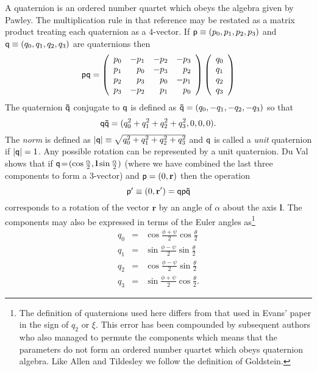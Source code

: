 \documentclass[a4paper,twoside]{report}
\providecommand{\bm}[1]{\mathbf{#1}}
\begin{document}
A quaternion  is an ordered number  quartet  which obeys  the  algebra
given  by   Pawley\cite{pawley:81}.  The multiplication   rule in that
reference may be restated as a matrix product treating each quaternion
as a  4-vector.  If  $\Quat{p} \equiv (p_0,p_1,p_2,p_3)$ and  $\Quat{q}
\equiv  (q_0,q_1,q_2,q_3)$  are quaternions then
\begin{equation}
\Quat{pq} = 
\left(
\begin{array}{rrrr}
p_0 & -p_1 & -p_2 & -p_3 \\
p_1 &  p_0 & -p_3 &  p_2 \\
p_2 &  p_3 &  p_0 & -p_1 \\
p_3 & -p_2 &  p_1 &  p_0 
\end{array}
\right) \left(
\begin{array}{r}
q_0 \\ q_1 \\ q_2 \\ q_3
\end{array}
\right)
\end{equation}
The quaternion $ \Quat{\tilde{q}} $ conjugate to $\Quat{q}$ is defined
as $\Quat{\tilde{q}} = (q_0,-q_1,-q_2,-q_3)$ so that
\begin{equation}
\Quat{q\tilde{q}} = (q_0^2+q_1^2+q_2^2+q_3^2,0,0,0).
\label{eqn:qnorm}
\end{equation}
The \emph{norm} is defined as $ |\Quat{q}| \equiv
\sqrt{q_0^2+q_1^2+q_2^2+q_3^2} $ and $\Quat{q}$ is called a
\emph{unit} quaternion if $ |\Quat{q}| = 1 $.  Any possible rotation
can be represented by a unit quaternion. Du Val shows\cite{duval:64}
that if $ \Quat{q} \! = \! (\cos \frac{\alpha}{2}, \bm{l} \sin
\frac{\alpha}{2}) $ (where we have combined the last three components
to form a 3-vector) and $\Quat{p} = (0,\bm{r})$ then the operation
\begin{equation}
\Quat{p'} \equiv (0,\bm{r'}) = \Quat{q p \tilde{q}}
\end{equation}
corresponds to a rotation of the vector $\bm{r}$ by an angle of
$\alpha$ about the axis $\bm{l}$.  The components may also be
expressed in terms of the Euler angles as\footnote{The definition of
  quaternions used here differs from that used in Evans'
  paper\cite[equation 21]{evans:77} in the sign of $q_2$ or $\xi$.
  This error has been compounded by subsequent
  authors\cite{sonnenschein:85,smith:82,laakonsen:85} who also managed
  to permute the components which means that the parameters do not
  form an ordered number quartet which obeys quaternion algebra. Like
  Allen and Tildesley\cite[page 88]{allen:87} we follow the definition
  of Goldstein\cite[pages 143 and 155]{goldstein:80}.}
\begin{eqnarray}
q_0 & = & \cos \frac{\phi+\psi}{2} \cos \frac{\theta}{2} \nonumber \\
q_1 & = & \sin \frac{\phi-\psi}{2} \sin \frac{\theta}{2} \nonumber \\
q_2 & = & \cos \frac{\phi-\psi}{2} \sin \frac{\theta}{2} \nonumber \\
q_3 & = & \sin \frac{\phi+\psi}{2} \cos \frac{\theta}{2}.
\end{eqnarray}
\end{document}
